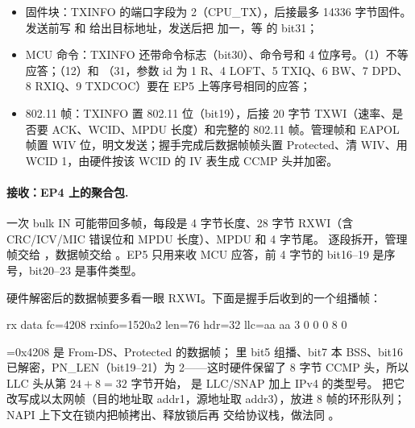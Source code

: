 \begin{itemize}
  \item 固件块：TXINFO 的端口字段为 2（CPU\_TX），后接最多 14336 字节固件。发送前写  和  给出目标地址，发送后把  加一，等  的 bit31；
  \item MCU 命令：TXINFO 还带命令标志（bit30）、命令号和 4 位序号。（1）不等应答；（12）和 （31，参数 id 为 1 R、4 LOFT、5 TXIQ、6 BW、7 DPD、8 RXIQ、9 TXDCOC）要在 EP5 上等序号相同的应答；
  \item 802.11 帧：TXINFO 置 802.11 位（bit19），后接 20 字节 TXWI（速率、是否要 ACK、WCID、MPDU 长度）和完整的 802.11 帧。管理帧和 EAPOL 帧置 WIV 位，明文发送；握手完成后数据帧帧头置 Protected、清 WIV、用 WCID 1，由硬件按该 WCID 的 IV 表生成 CCMP 头并加密。
\end{itemize}

\paragraph{接收：EP4 上的聚合包.} 一次 bulk IN 可能带回多帧，每段是 4 字节长度、28 字节 RXWI（含 CRC/ICV/MIC 错误位和 MPDU 长度）、MPDU 和 4 字节尾。 逐段拆开，管理帧交给 ，数据帧交给 。EP5 只用来收 MCU 应答，前 4 字节的 bit16--19 是序号，bit20--23 是事件类型。

硬件解密后的数据帧要多看一眼 RXWI。下面是握手后收到的一个组播帧：
\begin{txtcode}
rx data fc=4208 rxinfo=1520a2 len=76 hdr=32 llc=aa aa 3 0 0 0 8 0
\end{txtcode}
=0x4208 是 From-DS、Protected 的数据帧； 里 bit5 组播、bit7 本 BSS、bit16 已解密，PN\_LEN（bit19--21）为 2——这时硬件保留了 8 字节 CCMP 头，所以 LLC 头从第 $24+8=32$ 字节开始， 是 LLC/SNAP 加上 IPv4 的类型号。 把它改写成以太网帧（目的地址取 addr1，源地址取 addr3），放进 8 帧的环形队列；NAPI 上下文在锁内把帧拷出、释放锁后再  交给协议栈，做法同 。

